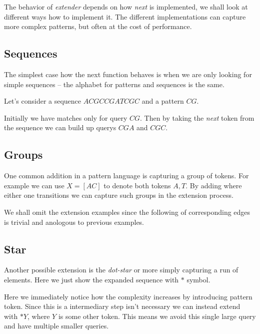 The behavior of \emph{extender} depends on how \emph{next} is 
implemented, we shall look at different ways how to implement it.
The different implementations can capture more complex patterns,
but often at the cost of performance.

\subsection{Sequences}

The simplest case how the next function behaves is when we are 
only looking for simple sequences -- the alphabet for patterns
and sequences is the same.

Let's consider a sequence $ACGCCGATCGC$ and a pattern $CG$.

\begin{figure}[H]
	
\end{figure}

Initially we have matches only for query $CG$. Then by taking
the \emph{next} token from the sequence we can build up
querys $CGA$ and $CGC$.

\subsection{Groups}

One common addition in a pattern language is capturing a group
of tokens. For example we can use $X = [AC]$ to denote both tokens $A, T$. 
By adding where either one transitions we can capture such groups in 
the extension process.

\begin{figure}[H]
	
\end{figure}

We shall omit the extension examples since the following of corresponding 
edges is trivial and anologous to previous examples.

\subsection{Star}

Another possible extension is the \emph{dot-star} or more simply capturing
a run of elements. Here we just show the expanded sequence with $*$ symbol.

\begin{figure}[H]
	
\end{figure}

Here we immediately notice how the complexity increases by introducing 
pattern token. Since this is a intermediary step isn't necessary we can 
instead extend with $*Y$, where $Y$ is some other token. This means we 
avoid this single large query and have multiple smaller queries.

